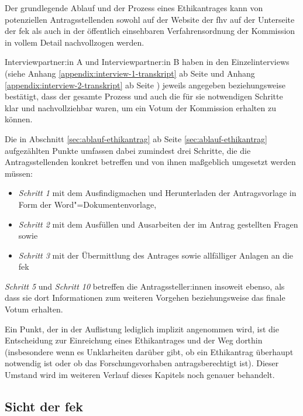 \documentclass[a4paper,12pt,twoside]{scrreprt}
\begin{document}
Der grundlegende Ablauf und der Prozess eines Ethikantrages kann von potenziellen Antragsstellenden sowohl auf der Website der \ac{fhv} auf der Unterseite der \ac{fek} \cite{fachhochschule_vorarlberg_gmbh_forschungsethik-kommission_2021} als auch in der öffentlich einsehbaren Verfahrensordnung \cite{forschungsethik-kommission_der_fachhochschule_vorarlberg_verfahrensordnung_2020} der Kommission in vollem Detail nachvollzogen werden.

Interviewpartner:in A und Interviewpartner:in B haben in den Einzelinterviews (siehe Anhang \ref{appendix:interview-1-transkript} ab Seite \pageref{appendix:interview-1-transkript} und Anhang \ref{appendix:interview-2-transkript} ab Seite \pageref{appendix:interview-2-transkript}) jeweils angegeben beziehungsweise bestätigt, dass der gesamte Prozess und auch die für sie notwendigen Schritte klar und nachvollziehbar waren, um ein Votum der Kommission erhalten zu können.

\medskip

Die in Abschnitt \ref{sec:ablauf-ethikantrag} ab Seite \ref{sec:ablauf-ethikantrag} aufgezählten Punkte umfassen dabei zumindest drei Schritte, die die Antragsstellenden konkret betreffen und von ihnen maßgeblich umgesetzt werden müssen:
\begin{itemize}
    \item \textit{Schritt 1} mit dem Ausfindigmachen und Herunterladen der Antragsvorlage in Form der Word"=Dokumentenvorlage,
    \item \textit{Schritt 2} mit dem Ausfüllen und Ausarbeiten der im Antrag gestellten Fragen sowie
    \item \textit{Schritt 3} mit der Übermittlung des Antrages sowie allfälliger Anlagen an die \ac{fek}
\end{itemize}

\noindent\textit{Schritt 5} und \textit{Schritt 10} betreffen die Antragssteller:innen insoweit ebenso, als dass sie dort Informationen zum weiteren Vorgehen beziehungsweise das finale Votum erhalten.

Ein Punkt, der in der Auflistung lediglich implizit angenommen wird, ist die Entscheidung zur Einreichung eines Ethikantrages und der Weg dorthin (insbesondere wenn es Unklarheiten darüber gibt, ob ein Ethikantrag überhaupt notwendig ist oder ob das Forschungsvorhaben antragsberechtigt ist). Dieser Umstand wird im weiteren Verlauf dieses Kapitels noch genauer behandelt.

\subsection{Sicht der \ac{fek}}
\label{sub-sec:sicht-fek}
\end{document}

